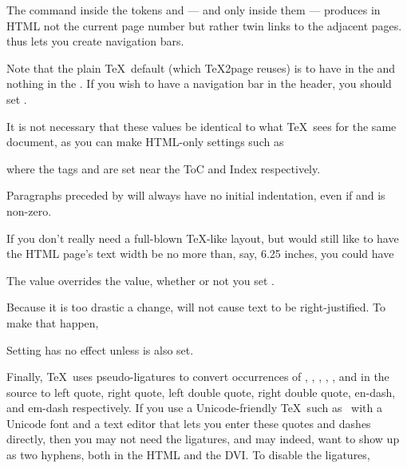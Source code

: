 The command \p{\folio} inside the tokens \p{\headline} and \p{\footline}
— and only inside them —
produces in HTML not the current page number but rather twin links to the
adjacent pages. \p{\folio} thus lets you create navigation
bars.

Note that the plain \TeX\ default (which
\TeX2page reuses) is to have \p{\folio} in the
\p{\footline} and nothing in the \p{\headline}.  If you wish
to have a navigation bar in the header, you should set
\p{\headline}.

It is not necessary that these values be
identical to what \TeX\ sees for the same document, as you can
make HTML-only settings such as

%

\n where the tags  and  are set near
the ToC and Index respectively.

%
Paragraphs preceded by \p{\noindent} will always have no initial
indentation, even if  and \p{\parskip} is
non-zero.

%
If you don’t really need a full-blown \TeX-like layout, but would
still like to have the HTML page’s text width be no more than,
say, 6.25 inches, you could have

\p{
\def\TZPhsize{6.25 in}
}
The \p{\TZPhsize} value overrides the \p{\hsize} value, whether
or not you set \p{\TZPtexlayout}.

Because it is too drastic a change,  will not cause
text to be right-justified.  To make that happen,


\n Setting \p{\TZPrightjustify} has no effect unless \p{\TZPtexlayout} is
also set.

Finally, \TeX\ uses pseudo-ligatures to convert occurrences of , , , , \p{--}, and \p{---}
in the source to left quote, right quote, left double quote, right double quote, en-dash, and em-dash respectively.
If you use a Unicode-friendly \TeX\ such as \XeTeX\ with a Unicode font and a text editor that lets you enter these quotes and dashes directly, then you may
not need the ligatures, and may indeed, want \p{--} to show up as two hyphens, both in the HTML and the DVI.  To disable the ligatures,

